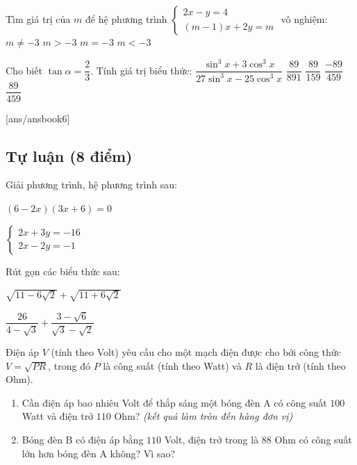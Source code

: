 \begin{ex}
Tìm giá trị của $m$ để hệ phương trình 
$\begin{cases} 
2x-y=4\\ 
(m-1)x+2y=m 
\end{cases}$ vô nghiệm:
\choice
{$m\ne-3$}
{$m>-3$}
{\True $m=-3$}
{$m<-3$}
\end{ex}

\begin{ex}
Cho biết $\tan \alpha=\dfrac{2}{3}$. Tính giá trị biểu thức: $\dfrac{\sin^3 x+3\cos^3 x}{27\sin^3 x-25\cos^3 x}$
\choice
{$\dfrac{89}{891}$}
{$\dfrac{89}{159}$}
{\True $\dfrac{-89}{459}$}
{$\dfrac{89}{459}$}
\end{ex}

[ans/ansbook6]

\setcounter{bt}{0}
\subsection{Tự luận (8 điểm)}

\begin{bt}[1 điểm]
Giải phương trình, hệ phương trình sau:
\begin{listEX}[2]
\item $(6-2x)(3x+6)=0$
\item $\begin{cases}
2x+3y=-16\\
2x-2y=-1
\end{cases}$
\end{listEX}
\end{bt}

\begin{bt}[1 điểm]
Rút gọn các biểu thức sau:
\begin{listEX}[2]
\item $\sqrt{11-6\sqrt{2}}+\sqrt{11+6\sqrt{2}}$
\item $\dfrac{26}{4-\sqrt{3}}+\dfrac{3-\sqrt{6}}{\sqrt{3}-\sqrt{2}}$
\end{listEX}
\end{bt}

\begin{bt}[1 điểm]
Điện áp $V$ (tính theo Volt) yêu cầu cho một mạch điện được cho bởi công thức $V=\sqrt{PR}$, trong đó $P$ là công suất (tính theo Watt) và $R$ là điện trở (tính theo Ohm).  
\begin{enumerate}
\item Cần điện áp bao nhiêu Volt để thắp sáng một bóng đèn A có công suất $100$ Watt và điện trở $110$ Ohm? \textit{(kết quả làm tròn đến hàng đơn vị)}
\item Bóng đèn B có điện áp bằng $110$ Volt, điện trở trong là $88$ Ohm có công suất lớn hơn bóng đèn A không? Vì sao?
\end{enumerate}
\end{bt}

